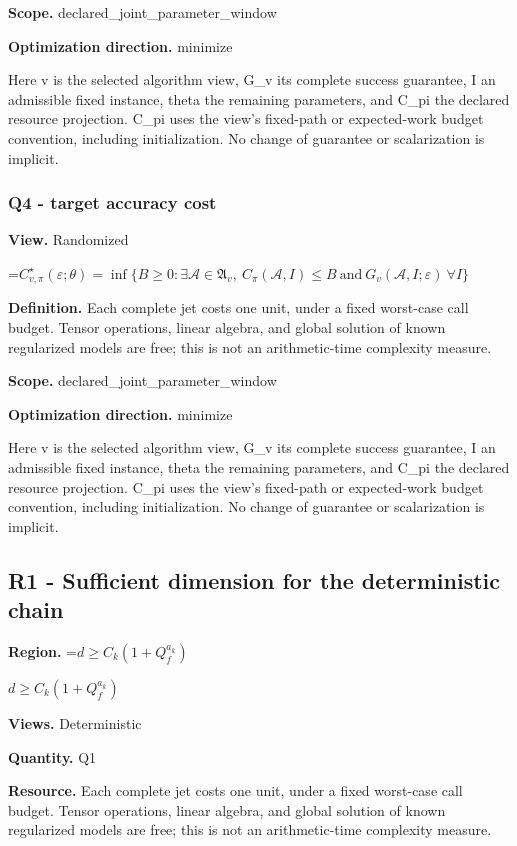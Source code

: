 \documentclass[10pt,a4paper]{article}
\newcommand{\AtlasMath}[1]{\par\begingroup\centering\setbox0=\hbox{$\displaystyle #1$}\ifdim\wd0>1.4\linewidth\typeout{ATLAS WIDE FORMULA: \the\wd0}\fi\ifdim\wd0>\linewidth\resizebox{\linewidth}{!}{\box0}\else\box0\fi\par\endgroup}
\newcommand{\AtlasInlineMath}[1]{\begingroup\setbox0=\hbox{$#1$}\ifdim\wd0>.4\linewidth\endgroup\AtlasMath{#1}\else\endgroup$#1$\fi}
\begin{document}
\textbf{Scope.} declared\_joint\_parameter\_window

\textbf{Optimization direction.} minimize

Here v is the selected algorithm view, G\_v its complete success guarantee, I an admissible fixed instance, theta the remaining parameters, and C\_pi the declared resource projection. C\_pi uses the view's fixed-path or expected-work budget convention, including initialization. No change of guarantee or scalarization is implicit.

\subsubsection{Q4 - target accuracy cost}
\textbf{View.} Randomized

\AtlasMath{C^\star_{v,\pi}(\varepsilon;\theta)=\inf\{B\ge0:\exists\mathcal A\in\mathfrak A_v,\ C_\pi(\mathcal A,I)\le B\ \text{and}\ G_v(\mathcal A,I;\varepsilon)\ \forall I\}}
\textbf{Definition.} Each complete jet costs one unit, under a fixed worst-case call budget. Tensor operations, linear algebra, and global solution of known regularized models are free; this is not an arithmetic-time complexity measure.

\textbf{Scope.} declared\_joint\_parameter\_window

\textbf{Optimization direction.} minimize

Here v is the selected algorithm view, G\_v its complete success guarantee, I an admissible fixed instance, theta the remaining parameters, and C\_pi the declared resource projection. C\_pi uses the view's fixed-path or expected-work budget convention, including initialization. No change of guarantee or scalarization is implicit.

\subsection{R1 - Sufficient dimension for the deterministic chain}
\textbf{Region.} \AtlasInlineMath{d\ge C_k(1+Q_f^{a_k})}

\textbf{Views.} Deterministic

\textbf{Quantity.} Q1

\textbf{Resource.} Each complete jet costs one unit, under a fixed worst-case call budget. Tensor operations, linear algebra, and global solution of known regularized models are free; this is not an arithmetic-time complexity measure.
\end{document}
